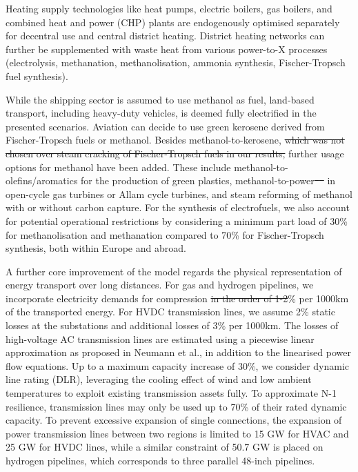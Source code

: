 \documentclass[5p,9pt,draft]{elsarticle}
\providecommand{\DIFaddtex}[1]{{\protect\color{blue}\uwave{#1}}} %
\providecommand{\DIFdeltex}[1]{{\protect\color{red}\sout{#1}}}                      %
\providecommand{\DIFaddbegin}{} %
\providecommand{\DIFaddend}{} %
\providecommand{\DIFdelbegin}{} %
\providecommand{\DIFdelend}{} %
\providecommand{\DIFadd}[1]{\texorpdfstring{\DIFaddtex{#1}}{#1}} %
\providecommand{\DIFdel}[1]{\texorpdfstring{\DIFdeltex{#1}}{}} %
\newcommand{\DIFscaledelfig}{0.5}
\newlength{\DIFdelgraphicswidth} %
\newlength{\DIFdelgraphicsheight} %
\newcommand{\DIFaddincludegraphics}[2][]{{\color{blue}\fbox{\DIFOincludegraphics[#1]{#2}}}} %
\newcommand{\DIFdelincludegraphics}[2][]{%
\sbox{\DIFdelgraphicsbox}{\DIFOincludegraphics[#1]{#2}}%
\settoboxwidth{\DIFdelgraphicswidth}{\DIFdelgraphicsbox} %
\settoboxtotalheight{\DIFdelgraphicsheight}{\DIFdelgraphicsbox} %
\scalebox{\DIFscaledelfig}{%
\parbox[b]{\DIFdelgraphicswidth}{\usebox{\DIFdelgraphicsbox}\\[-\baselineskip] \rule{\DIFdelgraphicswidth}{0em}}\llap{\resizebox{\DIFdelgraphicswidth}{\DIFdelgraphicsheight}{%
\setlength{\unitlength}{\DIFdelgraphicswidth}%
\begin{picture}(1,1)%
\thicklines\linethickness{2pt} %
{\color[rgb]{1,0,0}\put(0,0){\framebox(1,1){}}}%
{\color[rgb]{1,0,0}\put(0,0){\line( 1,1){1}}}%
{\color[rgb]{1,0,0}\put(0,1){\line(1,-1){1}}}%
\end{picture}%
}\hspace*{3pt}}} %
} %
\DeclareRobustCommand{\DIFaddbegin}{\DIFOaddbegin \let\includegraphics\DIFaddincludegraphics} %
\DeclareRobustCommand{\DIFaddend}{\DIFOaddend \let\includegraphics\DIFOincludegraphics} %
\DeclareRobustCommand{\DIFdelbegin}{\DIFOdelbegin \let\includegraphics\DIFdelincludegraphics} %
\DeclareRobustCommand{\DIFdelend}{\DIFOaddend \let\includegraphics\DIFOincludegraphics} %
\begin{document}
Heating supply technologies like heat pumps, electric boilers, gas boilers, and
combined heat and power (CHP) plants are endogenously optimised separately for
decentral use and central district heating. District heating networks can
further be supplemented with waste heat from various power-to-X processes
(electrolysis, methanation, methanolisation, ammonia synthesis, Fischer-Tropsch
fuel synthesis).

While the shipping sector is assumed to use methanol as fuel, land-based
transport, including heavy-duty vehicles, is deemed fully electrified in the
presented scenarios. Aviation can decide to use green kerosene derived from
Fischer-Tropsch fuels or methanol. Besides methanol-to-kerosene, \DIFdelbegin \DIFdel{which was not
chosen over steam cracking of Fischer-Tropsch fuels in our results, }\DIFdelend further
usage options for methanol have been added.
These include
methanol-to-olefins/aromatics for the production of green plastics,
methanol-to-power\DIFdelbegin \DIFdel{\mbox{%
\cite{brownUltralongdurationEnergy2023} }\hskip0pt%
}\DIFdelend \DIFaddbegin \DIFadd{\mbox{%
\cite{brownUltralongdurationEnergyStorage2023} }\hskip0pt%
}\DIFaddend in open-cycle gas
turbines or Allam cycle turbines, and steam reforming of methanol with or
without carbon capture. For the synthesis of electrofuels, we also account for
potential operational restrictions by considering a minimum part load of 30\%
for methanolisation and methanation compared to 70\% for Fischer-Tropsch
synthesis, both within Europe and abroad.

A further core improvement of the model regards the physical representation of
energy transport over long distances. For gas and hydrogen pipelines, we
incorporate electricity demands for compression \DIFdelbegin \DIFdel{in the order of 1-2}\DIFdelend \DIFaddbegin \DIFadd{of 1\% and 2}\DIFaddend \% per 1000km
of the transported energy\DIFaddbegin \DIFadd{, respectively}\DIFaddend .\cite{gasforclimateEuropeanHydrogen2021}
For HVDC transmission lines, we assume 2\% static losses at the substations and
additional losses of 3\% per 1000km. The losses of high-voltage AC transmission
lines are estimated using a piecewise linear approximation as proposed in
Neumann et al.,\cite{neumannAssessmentsLinear2022} in addition to the linearised
power flow equations.\cite{horschLinearOptimal2018} Up to a maximum capacity
increase of 30\%, we consider dynamic line rating (DLR), leveraging the cooling
effect of wind and low ambient temperatures to exploit existing transmission
assets fully.\cite{glaumLeveragingExisting2023} To approximate N-1 resilience,
transmission lines may only be used up to 70\% of their rated dynamic capacity.
To prevent excessive expansion of single connections, the expansion of power
transmission lines between two regions is limited to 15 GW for HVAC and 25 GW
for HVDC lines, while a similar constraint of 50.7 GW is placed on hydrogen
pipelines, which corresponds to three parallel 48-inch
pipelines.\cite{gasforclimateEuropeanHydrogen2021}
\end{document}
